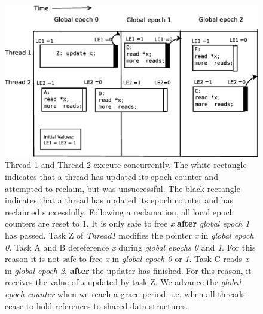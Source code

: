 \documentclass[a4paper]{article}
\begin{document}
\begin{figure}[float=tph]
\begin{center}
\includegraphics[scale=0.36]{../images/diagrams/rcuexp2}
\caption{Thread 1 and Thread 2 execute concurrently. 
The white rectangle indicates that a thread has updated its epoch counter and attempted to reclaim, but was unsuccessful. The black rectangle indicates that a thread has updated its epoch counter and has reclaimed successfully. Following a reclamation, all local epoch counters are reset to 1. 
It is only safe to free \emph{x}  \textbf{after} \emph{global epoch 1} has passed. Task Z of \emph{Thread1} modifies the pointer \emph{x} in \emph{global epoch 0}. Task A and B dereference \emph{x} during \emph{global epochs 0} and \emph{1}. For this reason it is not safe to free \emph{x} in \emph{global epoch 0} or \emph{1}. Task C reads \emph{x} in \emph{global epoch 2}, \textbf{after} the updater has finished. For this reason, it receives the value of \emph{x} updated by task Z. We advance the \emph{global epoch counter} when we reach a grace period, i.e. when all threads cease to hold references to shared data structures.}
\label{fig:rcuexp2}
\end{center}
\end{figure}
\end{document}
